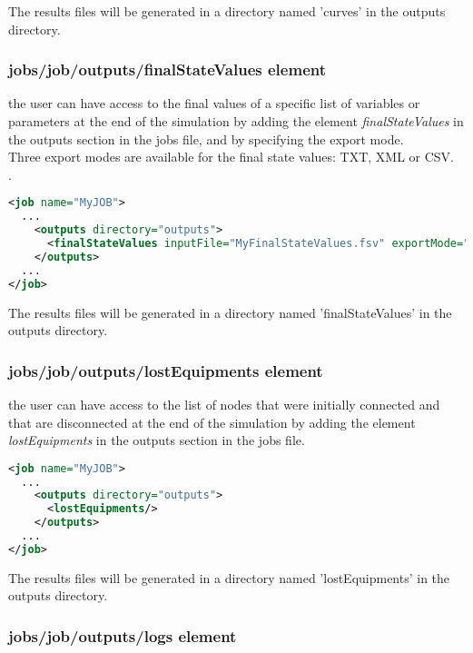\documentclass[a4paper, 12pt]{report}
\begin{document}
The results files will be generated in a directory named 'curves' in the outputs directory.

\subsubsection{jobs/job/outputs/finalStateValues element}
\label{DynawoInputFiles_inputs_jobs_job_outputs_finalStateValues}

the user can have access to the final values of a specific list of variables or parameters at the end of the simulation by adding the element
\textit{finalStateValues} in the outputs section in the jobs file, and by specifying the export mode.\\
Three export modes are available for the final state values: TXT, XML or CSV.\\.


\begin{lstlisting}[language=XML, morekeywords={finalState},numbers=none]
<job name="MyJOB">
  ...
    <outputs directory="outputs">
      <finalStateValues inputFile="MyFinalStateValues.fsv" exportMode="CSV"/>
    </outputs>
  ...
</job>
\end{lstlisting}

The results files will be generated in a directory named 'finalStateValues' in the outputs directory.

\subsubsection{jobs/job/outputs/lostEquipments element}
\label{DynawoInputFiles_inputs_jobs_job_outputs_lostEquipments}

the user can have access to the list of nodes that were initially connected and that are disconnected at the end of the simulation by adding the element
\textit{lostEquipments} in the outputs section in the jobs file.


\begin{lstlisting}[language=XML, morekeywords={finalState},numbers=none]
<job name="MyJOB">
  ...
    <outputs directory="outputs">
      <lostEquipments/>
    </outputs>
  ...
</job>
\end{lstlisting}

The results files will be generated in a directory named 'lostEquipments' in the outputs directory.

\subsubsection{jobs/job/outputs/logs element}
\label{DynawoInputFiles_inputs_jobs_job_outputs_logs}
\end{document}
